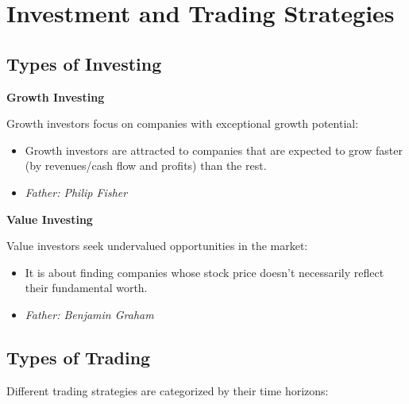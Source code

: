 \documentclass[12pt]{article}
\begin{document}
\section{Investment and Trading Strategies}

\subsection{Types of Investing}

\textbf{Growth Investing}

Growth investors focus on companies with exceptional growth potential:
\begin{itemize}
\item Growth investors are attracted to companies that are expected to grow faster (by revenues/cash flow and profits) than the rest.
\item \textit{Father: Philip Fisher}
\end{itemize}

\textbf{Value Investing}

Value investors seek undervalued opportunities in the market:
\begin{itemize}
\item It is about finding companies whose stock price doesn't necessarily reflect their fundamental worth.
\item \textit{Father: Benjamin Graham}
\end{itemize}

\subsection{Types of Trading}

Different trading strategies are categorized by their time horizons:
\end{document}

